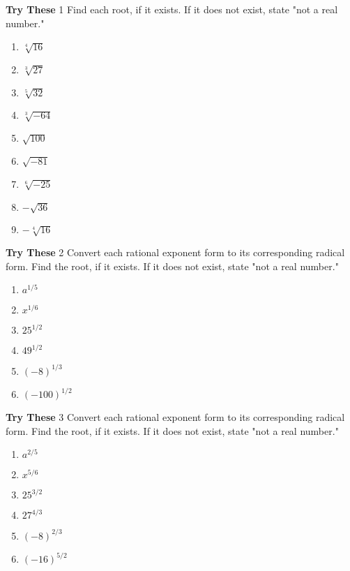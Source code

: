 \documentclass[a4paper]{JAC2003}
\begin{document}
\noindent\textcolor{red!75!black}{\textbf{Try These}} 1 Find each root, if it exists. If it does not exist, state "not a real number."
\begin{enumerate}
\item $\sqrt[4]{16}$

\item $\sqrt[3]{27}$

\item $\sqrt[5]{32}$

\item $\sqrt[3]{-64}$

\item $\sqrt{100}$

\item $\sqrt{-81}$

\item $\sqrt[6]{-25}$

\item $-\sqrt{36}$

\item $-\sqrt[4]{16}$
\end{enumerate}

\noindent\textcolor{red!75!black}{\textbf{Try These}} 2 Convert each rational exponent form to its corresponding radical form. Find the root, if it exists. If it does not exist, state "not a real number."
\begin{enumerate}
\item $a^{1 / 5}$

\item $x^{1 / 6}$

\item $25^{1 / 2}$

\item $49^{1 / 2}$

\item $(-8)^{1 / 3}$

\item $(-100)^{1 / 2}$
\end{enumerate}

\noindent\textcolor{red!75!black}{\textbf{Try These}} 3 Convert each rational exponent form to its corresponding radical form. Find the root, if it exists. If it does not exist, state "not a real number."
\begin{enumerate}
\item $a^{2 / 5}$

\item $x^{5 / 6}$

\item $25^{3 / 2}$

\item $27^{4 / 3}$

\item $(-8)^{2 / 3}$

\item $(-16)^{5 / 2}$
\end{enumerate}
\end{document}
